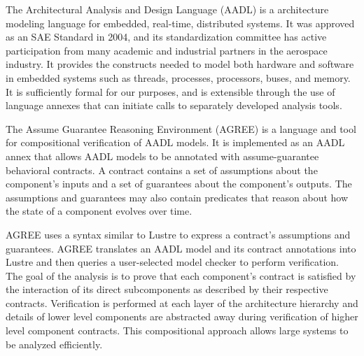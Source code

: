 The Architectural Analysis and Design Language (AADL)
\cite{Feiler12:AADL-MBE-book} is a architecture modeling language for embedded,
real-time, distributed systems. It was approved as an SAE Standard in 2004, and
its standardization committee has active participation from many academic and
industrial partners in the aerospace industry. It provides the constructs needed
to model both hardware and software in embedded systems such as threads, processes, processors, buses, and memory. It is sufficiently formal for our purposes,
and is extensible through the use of language annexes that can initiate calls to
separately developed analysis tools.

\begin{comment}
A model described in AADL consists of
a number of components and connections. Components are typical
constructs that appear in embedded systems. Components can represent
hardware constructs (e.g., processors, buses, memories) or software
constructs (e.g., processes, threads, subprograms). The language
distinguishes between component types and implementations. A component
type describes the component's interface (e.g., inputs, outputs) as
well as other component specific properties. A component
implementation describes the subcomponents and connections that
implement this interface.
\end{comment}

The Assume Guarantee Reasoning
Environment (AGREE) \cite{Cofer12:comp-verif} 
is a language and tool for compositional verification of AADL models.  It is implemented as an AADL annex
that allows AADL models to be annotated with  assume-guarantee behavioral contracts.  
A contract contains a set of assumptions about the component's
inputs and a set of guarantees about the component's outputs. The assumptions
and guarantees may also contain predicates that reason about how the state of
a component evolves over time.

AGREE uses a syntax similar to Lustre \cite{Lustre-91} to express a contract's assumptions
and guarantees. AGREE translates an AADL model and its contract annotations
into Lustre and then queries a user-selected model checker to perform verification.
The goal of the analysis is to prove that each component's contract
is satisfied by the interaction of its direct subcomponents as
described by their respective contracts. Verification is performed at each
layer of the architecture hierarchy and details of lower level
components are abstracted away during verification of higher level
component contracts.  This compositional approach allows large systems to be analyzed efficiently.  

